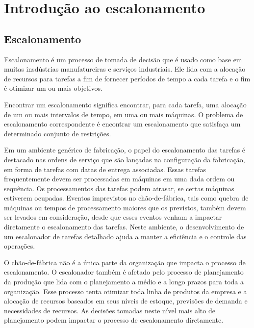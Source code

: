 \cleardoublepage
\pagestyle{fancy}


\chapter{Introdução ao escalonamento}\label{cap2}

\section{Escalonamento}\label{cap2:escalonamento}

Escalonamento é um processo de tomada de decisão que é usado como base em muitas insdústrias manufatureiras e serviços industriais. Ele lida com a alocação de recursos para tarefas a fim de fornecer períodos de tempo a cada tarefa  e o fim é otimizar um ou mais objetivos.

Encontrar um escalonamento significa encontrar, para cada tarefa, uma alocação de um ou mais intervalos de tempo, em uma ou mais máquinas. O problema de escalonamento correspondente é encontrar um escalonamento que satisfaça um determinado conjunto de restrições.

Em um ambiente genérico de fabricação, o papel do escalonamento das tarefas é 
destacado nas ordens de serviço que são lançadas na configuração da fabricação,
em forma de tarefas com datas de entrega associadas. Essas tarefas 
frequentemente devem ser processadas em máquinas em uma dada ordem ou 
sequência. Os processamentos das tarefas podem atrasar, se certas máquinas 
estiverem ocupadas. Eventos imprevistos no chão-de-fábrica, tais como quebra de 
máquinas ou tempos de processamento maiores que os previstos, também devem 
ser levados em consideração, desde que esses eventos venham a impactar 
diretamente o escalonamento das tarefas. Neste ambiente, o desenvolvimento de um escalonador de tarefas detalhado ajuda a manter a eficiência e o controle das 
operações. 

O chão-de-fábrica não é a única parte da organização que impacta o 
processo de escalonamento. O escalonador também é afetado pelo processo de 
planejamento da produção que lida com o planejamento a médio e a longo prazos 
para toda a organização. Esse processo tenta otimizar toda linha de produtos da 
empresa e a alocação de recursos baseados em seus níveis de estoque, previsões 
de demanda e necessidades de recursos. As decisões tomadas neste nível mais alto 
de planejamento podem impactar o processo de escalonamento diretamente. 

